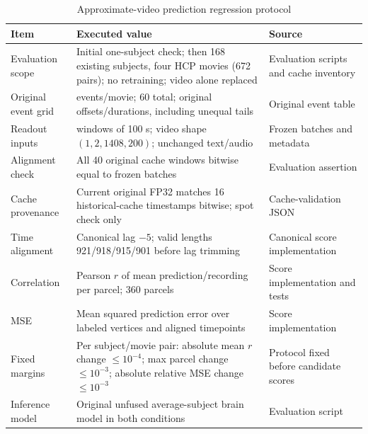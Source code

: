 \begin{table}[htbp]\centering\sffamily\small
\caption{Approximate-video prediction regression protocol}
\label{tab:score-settings}
\begin{tabular}{@{}>{\raggedright\arraybackslash}p{.21\linewidth}>{\raggedright\arraybackslash}p{.49\linewidth}>{\raggedright\arraybackslash}p{.24\linewidth}@{}}\toprule
Item & Executed value & Source \\\midrule
Evaluation scope & Initial one-subject check; then 168 existing subjects, four HCP movies (672 pairs); no retraining; video alone replaced & Evaluation scripts and cache inventory \\
Original event grid & 15 events/movie; 60 total; original offsets/durations, including unequal tails & Original event table \\
Readout inputs & 40 windows of 100 s; video shape $(1,2,1408,200)$; unchanged text/audio & Frozen batches and metadata \\
Alignment check & All 40 original cache windows bitwise equal to frozen batches & Evaluation assertion \\
Cache provenance & Current original FP32 matches 16 historical-cache timestamps bitwise; spot check only & Cache-validation JSON \\
Time alignment & Canonical lag $-5$; valid lengths 921/918/915/901 before lag trimming & Canonical score implementation \\
Correlation & Pearson $r$ of mean prediction/recording per parcel; 360 parcels & Score implementation and tests \\
MSE & Mean squared prediction error over labeled vertices and aligned timepoints & Score implementation \\
Fixed margins & Per subject/movie pair: absolute mean $r$ change $\leq10^{-4}$; max parcel change $\leq10^{-3}$; absolute relative MSE change $\leq10^{-3}$ & Protocol fixed before candidate scores \\
Inference model & Original unfused average-subject brain model in both conditions & Evaluation script \\
\bottomrule\end{tabular}\end{table}
\clearpage
